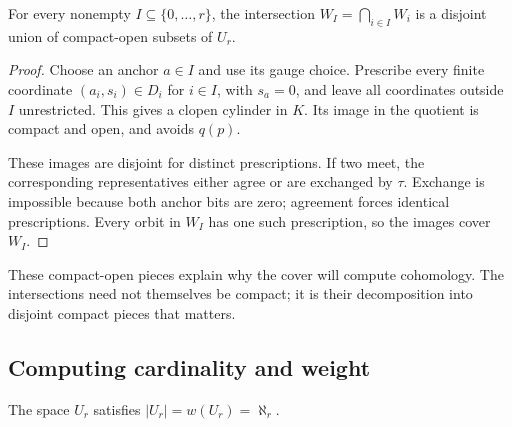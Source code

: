 \begin{lemma}\label{lem:cells}
For every nonempty \(I\subseteq\{0,\ldots,r\}\), the intersection
\(W_I=\bigcap_{i\in I}W_i\) is a disjoint union of compact-open
subsets of \(U_r\).
\end{lemma}

\begin{proof}
Choose an anchor \(a\in I\) and use its gauge choice. Prescribe every
finite coordinate \((a_i,s_i)\in D_i\) for \(i\in I\), with
\(s_a=0\), and leave all coordinates outside \(I\) unrestricted.
This gives a clopen cylinder in \(K\). Its image in the quotient is
compact and open, and avoids \(q(p)\).

These images are disjoint for distinct prescriptions. If two meet,
the corresponding representatives either agree or are exchanged by
\(\tau\). Exchange is impossible because both anchor bits are zero;
agreement forces identical prescriptions. Every orbit in \(W_I\)
has one such prescription, so the images cover \(W_I\).
\end{proof}

These compact-open pieces explain why the cover will compute
cohomology. The intersections need not themselves be compact; it is
their decomposition into disjoint compact pieces that matters.

\subsection{Computing cardinality and weight}

\begin{proposition}\label{prop:size}
The space \(U_r\) satisfies \(|U_r|=w(U_r)=\aleph_r\).
\end{proposition}

